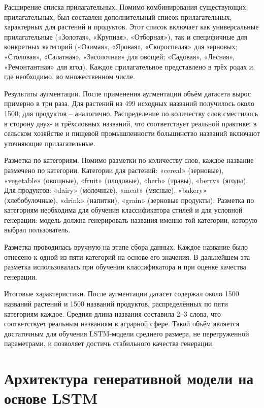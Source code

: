 Расширение списка прилагательных. Помимо комбинирования существующих прилагательных, был составлен дополнительный список прилагательных, характерных для растений и продуктов. Этот список включает как универсальные прилагательные («Золотая», «Крупная», «Отборная»), так и специфичные для конкретных категорий («Озимая», «Яровая», «Скороспелая» для зерновых; «Столовая», «Салатная», «Засолочная» для овощей; «Садовая», «Лесная», «Ремонтантная» для ягод). Каждое прилагательное представлено в трёх родах и, где необходимо, во множественном числе.

Результаты аугментации. После применения аугментации объём датасета вырос примерно в три раза. Для растений из 499 исходных названий получилось около 1500, для продуктов -- аналогично. Распределение по количеству слов сместилось в сторону двух- и трёхсловных названий, что соответствует реальной практике: в сельском хозяйстве и пищевой промышленности большинство названий включают уточняющие прилагательные.

Разметка по категориям. Помимо разметки по количеству слов, каждое название размечено по категории. Категории для растений: «cereal» (зерновые), «vegetable» (овощные), «fruit» (плодовые), «herb» (травы), «berry» (ягоды). Для продуктов: «dairy» (молочные), «meat» (мясные), «bakery» (хлебобулочные), «drink» (напитки), «grain» (зерновые продукты). Разметка по категориям необходима для обучения классификатора стилей и для условной генерации: модель должна генерировать названия именно той категории, которую выбрал пользователь.

Разметка проводилась вручную на этапе сбора данных. Каждое название было отнесено к одной из пяти категорий на основе его значения. В дальнейшем эта разметка использовалась при обучении классификатора и при оценке качества генерации.

Итоговые характеристики. После аугментации датасет содержал около 1500 названий растений и 1500 названий продуктов, распределённых по пяти категориям каждое. Средняя длина названия составила 2--3 слова, что соответствует реальным названиям в аграрной сфере. Такой объём является достаточным для обучения LSTM-модели среднего размера, не перегруженной параметрами, и позволяет достичь стабильного качества генерации.

\section{Архитектура генеративной модели на основе LSTM}\label{ux430ux440ux445ux438ux442ux435ux43aux442ux443ux440ux430-ux433ux435ux43dux435ux440ux430ux442ux438ux432ux43dux43eux439-ux43cux43eux434ux435ux43bux438-ux43dux430-ux43eux441ux43dux43eux432ux435-lstm}

